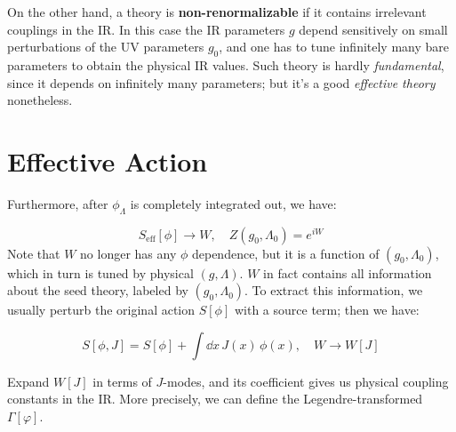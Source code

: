 \documentclass[a4paper,10pt]{article}
\begin{document}
	On the other hand, a theory is \textbf{non-renormalizable} if it
	contains irrelevant couplings in the IR. In this case the IR parameters
	$g$ depend sensitively on small perturbations of the UV parameters
	$g_0$, and one has to tune infinitely many bare parameters to obtain
	the physical IR values. Such theory is hardly \emph{fundamental}, since
	it depends on infinitely many parameters; but it's a good
	\emph{effective theory} nonetheless.
	
\section{Effective Action}
	
	Furthermore, after $\phi_\Lambda$ is completely integrated out, we
	have:
	
	\begin{equation}
	  S_{\mathrm{eff}}[\phi] \to W,\quad
	  Z(g_0,\Lambda_0) = e^{iW}
	\end{equation}
	Note that $W$ no longer has any $\phi$ dependence, but it is a
	function of $(g_0,\Lambda_0)$, which in turn is tuned by physical
	$(g,\Lambda)$. $W$ in fact contains all information about the seed
	theory, labeled by $(g_0,\Lambda_0)$. To extract this information, we
	usually perturb the original action $S[\phi]$ with a source term; then
	we have:
	
	\begin{equation}
	  S[\phi,J]
	  = S[\phi] + \int \dd{x}\,J(x)\,\phi(x),\quad
	  W \to W[J]
	\end{equation}
	
	Expand $W[J]$ in terms of $J$-modes, and its coefficient gives us
	physical coupling constants in the IR. More precisely, we can define the Legendre-transformed $\Gamma[\varphi]$.


\printbibliography[%
	,heading = bibintoc
]
\end{document}
